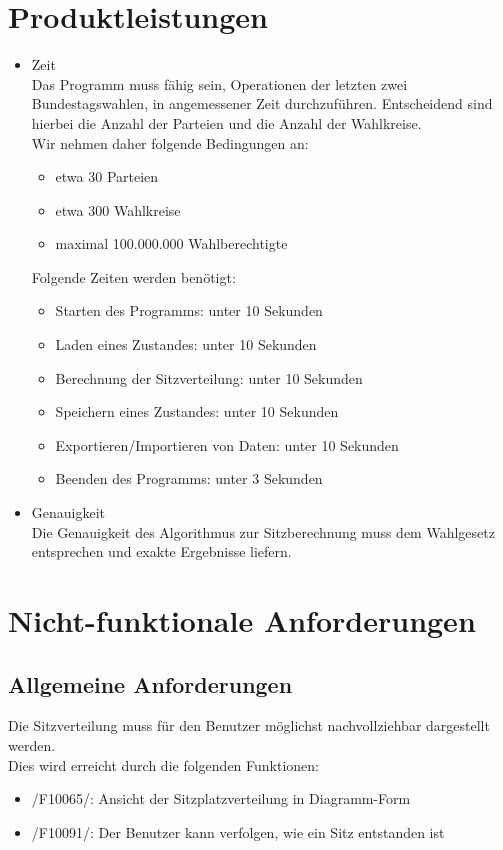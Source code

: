 \documentclass[10pt,a4paper]{article}
\begin{document}
\section{Produktleistungen}
\begin{itemize}
	\item Zeit \hfill \\
	Das Programm muss fähig sein, Operationen der letzten zwei Bundestagswahlen, in angemessener Zeit durchzuführen. Entscheidend sind hierbei die Anzahl der Parteien und die Anzahl der Wahlkreise.
	\\ Wir nehmen daher folgende Bedingungen an:
	\begin{itemize}
		\item etwa 30 Parteien
		\item etwa 300 Wahlkreise
		\item maximal 100.000.000 Wahlberechtigte
	\end{itemize}
	Folgende Zeiten werden benötigt:
	\begin{itemize}
		\item Starten des Programms: unter 10 Sekunden
		\item Laden eines Zustandes: unter 10 Sekunden
		\item Berechnung der Sitzverteilung: unter 10 Sekunden
		\item Speichern eines Zustandes: unter 10 Sekunden
		\item Exportieren/Importieren von Daten: unter 10 Sekunden
		\item Beenden des Programms: unter 3 Sekunden
	\end{itemize}
	\item Genauigkeit \hfill \\
	Die Genauigkeit des Algorithmus zur Sitzberechnung muss dem Wahlgesetz entsprechen und exakte Ergebnisse liefern.
\end{itemize}


\section{Nicht-funktionale Anforderungen}
\subsection{Allgemeine Anforderungen}
Die Sitzverteilung muss für den Benutzer möglichst nachvollziehbar dargestellt werden. \hfill \\
Dies wird erreicht durch die folgenden Funktionen:
\begin{itemize}
	\item /F10065/: Ansicht der Sitzplatzverteilung in Diagramm-Form
	\item /F10091/: Der Benutzer kann verfolgen, wie ein Sitz entstanden ist
\end{itemize}
\end{document}
